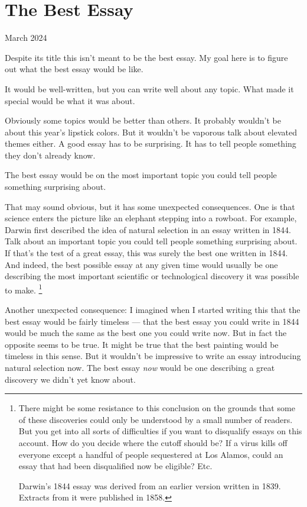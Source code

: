 \chapter{The Best Essay}

March 2024

Despite its title this isn't meant to be the best essay. My goal here is
to figure out what the best essay would be like.

It would be well-written, but you can write well about any topic. What
made it special would be what it was about.

Obviously some topics would be better than others. It probably wouldn't
be about this year's lipstick colors. But it wouldn't be vaporous talk
about elevated themes either. A good essay has to be surprising. It has
to tell people something they don't already know.

The best essay would be on the most important topic you could tell
people something surprising about.

That may sound obvious, but it has some unexpected consequences. One is
that science enters the picture like an elephant stepping into a
rowboat. For example, Darwin first described the idea of natural
selection in an essay written in 1844. Talk about an important topic you
could tell people something surprising about. If that's the test of a
great essay, this was surely the best one written in 1844. And indeed,
the best possible essay at any given time would usually be one
describing the most important scientific or technological discovery it
was possible to make. \footnote{There might be some resistance to this conclusion on the grounds
that some of these discoveries could only be understood by a small
number of readers. But you get into all sorts of difficulties if you
want to disqualify essays on this account. How do you decide where the
cutoff should be? If a virus kills off everyone except a handful of
people sequestered at Los Alamos, could an essay that had been
disqualified now be eligible? Etc.

Darwin's 1844 essay was derived from an earlier version written in 1839.
Extracts from it were published in 1858.}

Another unexpected consequence: I imagined when I started writing this
that the best essay would be fairly timeless --- that the best essay you
could write in 1844 would be much the same as the best one you could
write now. But in fact the opposite seems to be true. It might be true
that the best painting would be timeless in this sense. But it wouldn't
be impressive to write an essay introducing natural selection now. The
best essay \emph{now} would be one describing a great discovery we
didn't yet know about.

